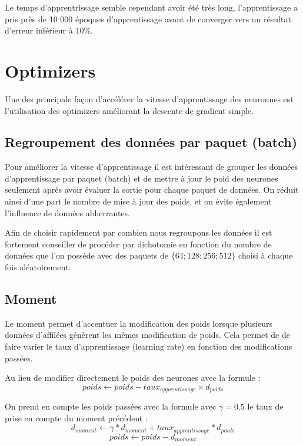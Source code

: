 \documentclass[12pt,a4paper, french]{article}
\begin{document}
Le temps d'apprentrissage semble cependant avoir été très long, l'apprentissage a pris près de 10 000 époques d'apprentissage avant de converger vers un résultat d'erreur inférieur à 10\%.

\section{Optimizers}
Une des principale façon d'accélérer la vitesse d'apprentissage des neuronnes est l'utilisation des optimizers améliorant la descente de gradient simple.

\subsection{Regroupement des données par paquet (batch)}
Pour améliorer la vitesse d'apprentissage il est intéressant de grouper les données d'apprentissage par paquet (batch) et de mettre à jour le poid des neurones seulement après avoir évaluer la sortie pour chaque paquet de données. On réduit ainsi d'une part le nombre de mise à jour des poids, et on évite également l'influence de données abherrantes.  

Afin de choisir rapidement par combien nous regroupons les données il est fortement conseiller de procéder par dichotomie en fonction du nombre de données que l'on possède avec des paquets de $\{64; 128; 256; 512\}$ choisi à chaque fois aléatoirement.

\subsection{Moment}
Le moment permet d'accentuer la modification des poids lorsque plusieurs données d'affilées génèrent les mêmes modification de poids. Cela permet de de faire varier le taux d'apprentissage (learning rate) en fonction des modifications passées.

Au lieu de modifier directement le poids des neurones avec la formule :
\begin{equation}
	poids \leftarrow
	poids - taux_{apprentissage} \times d_{poids}
\end{equation}

On prend en compte les poids passées avec la formule avec $\gamma = 0.5$ le taux de prise en compte du moment précédent :
\begin{equation}
	d_{moment} \leftarrow 
	\gamma * d_{moment} + taux_{apprentissage} * d_{poids}
\end{equation}
\begin{equation}
	poids \leftarrow
	poids - d_{moment}
\end{equation}
\end{document}
